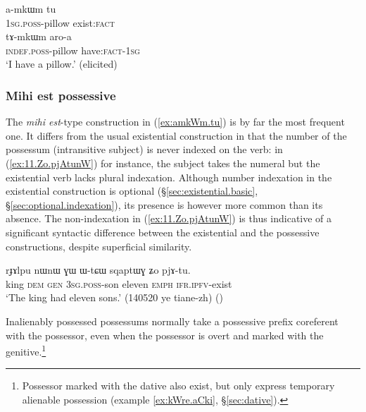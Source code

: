 \begin{exe}
\ex \label{ex:have.pillow}
\begin{xlist}
\ex \label{ex:amkWm.tu}
\gll a-mkɯm tu \\
\textsc{1sg}.\textsc{poss}-pillow exist:\textsc{fact} \\
\ex \label{ex:tamkWm.aroa}
\gll tɤ-mkɯm aro-a \\
\textsc{indef}.\textsc{poss}-pillow have:\textsc{fact}-\textsc{1sg} \\
\glt `I have a pillow.' (elicited)
\end{xlist}
\end{exe}
 
  
 \subsubsection{Mihi est possessive} \label{sec:possessive.mihi.est}
The \textit{mihi est}-type construction in (\ref{ex:amkWm.tu}) is by far the most frequent one.  It differs from the usual existential construction in that the number of the possessum (intransitive subject) is never indexed on the verb: in (\ref{ex:11.Zo.pjAtunW}) for instance, the subject  takes the numeral  but the existential verb  lacks plural indexation. Although number indexation in the existential construction is optional (§\ref{sec:existential.basic}, §\ref{sec:optional.indexation}), its presence is however more common than its absence. The non-indexation in (\ref{ex:11.Zo.pjAtunW}) is thus indicative of a significant syntactic difference between the existential and the possessive constructions, despite superficial similarity.
  
\begin{exe}
\ex \label{ex:11.Zo.pjAtunW}
\gll   rɟɤlpu nɯnɯ ɣɯ ɯ-tɕɯ sqaptɯɣ ʑo pjɤ-tu. \\
king \textsc{dem} \textsc{gen}  \textsc{3sg}.\textsc{poss}-son eleven \textsc{emph} \textsc{ifr}.\textsc{ipfv}-exist  \\
\glt `The king had eleven sons.' (140520 ye tiane-zh)
()
 \end{exe}
 
Inalienably possessed possessums normally take a possessive prefix coreferent with the possessor, even when the possessor is overt and marked with the genitive.\footnote{Possessor marked with the dative also exist, but only express temporary alienable possession (example \ref{ex:kWre.aCki}, §\ref{sec:dative}). } 

